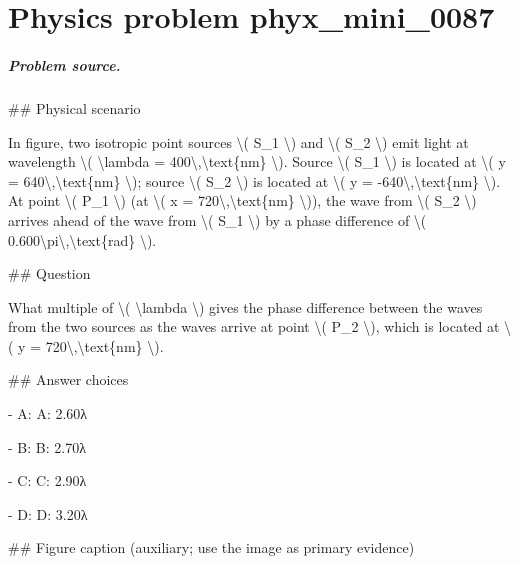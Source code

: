 
\chapter{Physics problem phyx\_mini\_0087}
\label{ch:PhyXMiniProblems_problem_phyx_mini_0087}

\paragraph{Problem source.}
\#\# Physical scenario

In figure, two isotropic point sources \textbackslash{}( S\_1 \textbackslash{}) and \textbackslash{}( S\_2 \textbackslash{}) emit light at wavelength \textbackslash{}( \textbackslash{}lambda = 400\textbackslash{},\textbackslash{}text\{nm\} \textbackslash{}). Source \textbackslash{}( S\_1 \textbackslash{}) is located at \textbackslash{}( y = 640\textbackslash{},\textbackslash{}text\{nm\} \textbackslash{}); source \textbackslash{}( S\_2 \textbackslash{}) is located at \textbackslash{}( y = -640\textbackslash{},\textbackslash{}text\{nm\} \textbackslash{}). At point \textbackslash{}( P\_1 \textbackslash{}) (at \textbackslash{}( x = 720\textbackslash{},\textbackslash{}text\{nm\} \textbackslash{})), the wave from \textbackslash{}( S\_2 \textbackslash{}) arrives ahead of the wave from \textbackslash{}( S\_1 \textbackslash{}) by a phase difference of \textbackslash{}( 0.600\textbackslash{}pi\textbackslash{},\textbackslash{}text\{rad\} \textbackslash{}).

\#\# Question

What multiple of \textbackslash{}( \textbackslash{}lambda \textbackslash{}) gives the phase difference between the waves from the two sources as the waves arrive at point \textbackslash{}( P\_2 \textbackslash{}), which is located at \textbackslash{}( y = 720\textbackslash{},\textbackslash{}text\{nm\} \textbackslash{}).

\#\# Answer choices

- A: A: 2.60λ

- B: B: 2.70λ

- C: C: 2.90λ

- D: D: 3.20λ

\#\# Figure caption (auxiliary; use the image as primary evidence)

